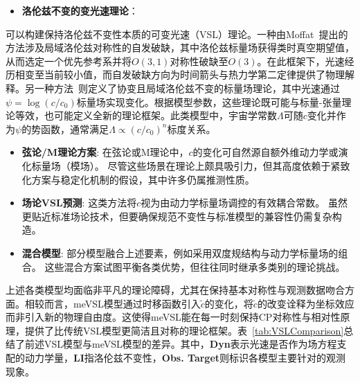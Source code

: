 \documentclass[jkps,preprint,fleqn]{revtex4}
\newcommand{\tc}{\tilde{c}}
\begin{document}
\begin{CJK*}{UTF8}{gbsn}
\begin{itemize}
    \item \textbf{洛伦兹不变的变光速理论}：
\end{itemize}
可以构建保持洛伦兹不变性本质的可变光速（VSL）理论。一种由Moffat~\cite{Moffat:1992ud}提出的方法涉及局域洛伦兹对称性的自发破缺，其中洛伦兹标量场获得类时真空期望值，从而选定一个优先参考系并将$O(3,1)$对称性破缺至$O(3)$。在此框架下，光速经历相变至当前较小值，而自发破缺方向为时间箭头与热力学第二定律提供了物理解释。另一种方法~\cite{Magueijo:2000zt}则定义了协变且局域洛伦兹不变的标量场理论，其中光速通过$\psi = \log(c/c_0)$标量场实现变化。根据模型参数，这些理论既可能与标量-张量理论等效，也可能定义全新的理论框架。此类模型中，宇宙学常数$\Lambda$可随$c$变化并作为$\psi$的势函数，通常满足$\Lambda \propto (c/c_0)^n$标度关系\cite{Manida:1999rx,Barrow:1999st,Stepanov:1999ax,Magueijo:2000au,Moffat:2002nm}。

\begin{itemize}
  \item \textbf{弦论/M理论方案}:
    在弦论或M理论中，$c$的变化可自然源自额外维动力学或演化标量场（模场）\cite{Kaelbermann:1998hu,Randall:1999ee,Randall:1999vf,Kiritsis:1999tx,Chung:1999xg,Alexander:1999cb,Ishihara:2000nf,Csaki:2000dm,Youm:2001sw,Youm:2001zk,Grojean:2001pv,Youm:2001zp}。
    尽管这些场景在理论上颇具吸引力，但其高度依赖于紧致化方案与稳定化机制的假设，其中许多仍属推测性质。
   \item \textbf{场论VSL预测}:
    这类方法将$c$视为由动力学标量场调控的有效耦合常数\cite{Drummond:1979pp,Novello:1988ma,Barton:1989dq,Scharnhorst:1990sr,Shore:1995fz,Colladay:1995qb,Coleman:1998ti,Bertolami:1999da,Shore:2000bs,Greenberg:2002uu,Teyssandier:2003qh,Shore:2003zc,Blasone:2003wf}。
    虽然更贴近标准场论技术，但要确保规范不变性与标准模型的兼容性仍需复杂构造。
    \item \textbf{混合模型}:
    部分模型融合上述要素，例如采用双度规结构与动力学标量场的组合\cite{Alexander:2001dr,Burgess:2002tb}。
    这些混合方案试图平衡各类优势，但往往同时继承多类别的理论挑战。
\end{itemize}

上述各类模型均面临非平凡的理论障碍，尤其在保持基本对称性与观测数据吻合方面。相较而言，meVSL模型通过时移函数引入$\tc$的变化，将$\tc$的改变诠释为坐标效应而非引入新的物理自由度。这使得meVSL能在每一时刻保持CP对称性与相对性原理，提供了比传统VSL模型更简洁且对称的理论框架。表~\ref{tab:VSLComparison}总结了前述VSL模型与meVSL模型的差异。其中，\textbf{Dyn}表示光速是否作为场方程支配的动力学量，\textbf{LI}指洛伦兹不变性，\textbf{Obs. Target}则标识各模型主要针对的观测现象。

\end{CJK*}
\end{document}
